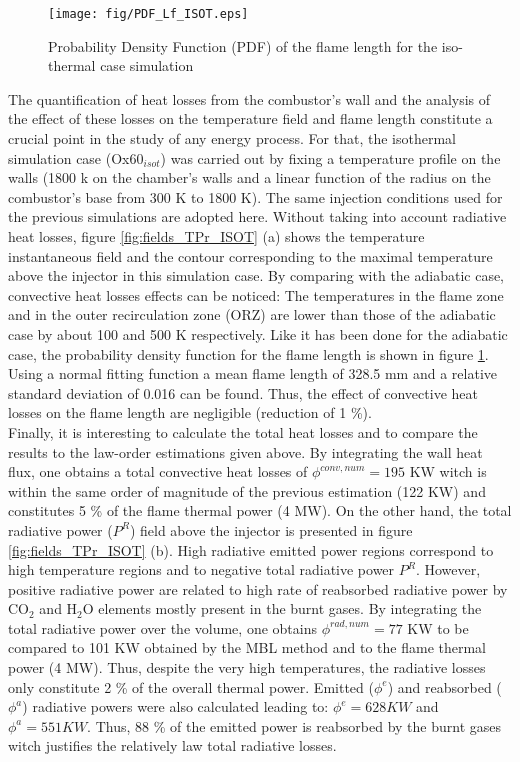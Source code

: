 \documentclass[twocolumn,10pt]{asme2e}
\begin{document}
\begin{figure}
   \centering
       \texttt{[image: fig/PDF\_Lf\_ISOT.eps]}
      \caption{ Probability  Density  Function  (PDF) of the flame length for the iso-thermal case simulation }
   \label{fig:PDF_ISOT}
   \vspace{-0.05 cm}
\end{figure}


The quantification of heat losses from the combustor's wall and the analysis of the effect of these losses on the temperature field and flame length constitute a crucial point in the study of any energy process. For that, the isothermal simulation case (Ox60$_{isot}$) was carried out by fixing a temperature profile on the walls (1800 k on the chamber's walls and a linear function of the radius on the combustor's base from 300 K to 1800 K).  The same injection conditions used for the previous simulations are adopted here.
Without taking into account radiative heat losses, figure \ref{fig:fields_TPr_ISOT} (a) shows the temperature instantaneous field and the contour corresponding to the maximal temperature above the injector in this simulation case. By comparing with the adiabatic case, convective heat losses effects can be noticed: The temperatures in the flame zone and in the outer recirculation zone (ORZ) are lower than those of the adiabatic case by about 100 and 500 K respectively. Like it has been done for the adiabatic case, the probability density function for the flame length is shown in figure \ref{fig:PDF_ISOT}. Using a normal fitting function a mean flame length of 328.5 mm and a relative standard deviation of 0.016 can be found. Thus, the effect of convective heat losses on the flame length are negligible (reduction of 1 \%). \\
Finally, it is interesting to calculate the total heat losses and to compare the results to the law-order estimations given above. By integrating the wall heat flux, one obtains a total convective heat losses of $\phi^{conv,num} = 195$ KW witch is within the same order of magnitude of the previous estimation (122 KW) and constitutes 5 \% of the flame thermal power (4 MW). On the other hand, the total radiative power ($P^R$) field above the injector is presented in figure \ref{fig:fields_TPr_ISOT} (b). High radiative emitted power regions correspond to high temperature regions and to negative total radiative power $P^R$. However, positive radiative power are related to high rate of  reabsorbed radiative power  by CO$_2$ and H$_2$O elements mostly present in the burnt gases. By integrating the total radiative power over the volume, one obtains $\phi^{rad,num} = 77$ KW to be compared to 101 KW obtained by the MBL method and to the flame thermal power (4 MW). Thus, despite the very high temperatures, the radiative losses only constitute 2 \% of the overall thermal power. Emitted ($\phi^{e}$) and reabsorbed ($\phi^{a}$) radiative powers were also calculated leading to: $\phi^{e}=628 KW$ and $\phi^{a}=551 KW$. Thus, 88 \% of the emitted power is reabsorbed by the burnt gases witch justifies the relatively law total radiative losses.   
\end{document}
